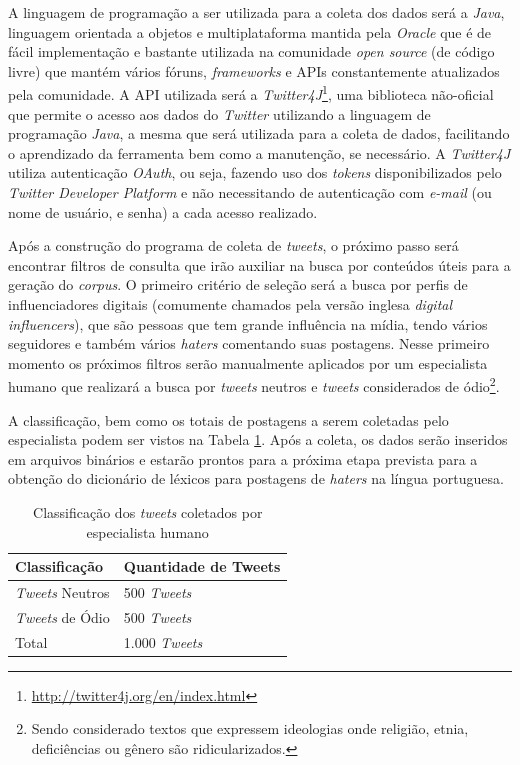 A linguagem de programação a ser utilizada para a coleta dos dados será a \textit{Java}, linguagem orientada a objetos e multiplataforma mantida pela \textit{Oracle} que é de fácil implementação e bastante utilizada na comunidade \textit{open source} (de código livre) que mantém vários fóruns, \textit{frameworks} e APIs constantemente atualizados pela comunidade. A API utilizada será a \textit{Twitter4J}\footnote{\url{http://twitter4j.org/en/index.html}}, uma biblioteca não-oficial que permite o acesso aos dados do \textit{Twitter} utilizando a linguagem de programação \textit{Java}, a mesma que será utilizada para a coleta de dados, facilitando o aprendizado da ferramenta bem como a manutenção, se necessário. A \textit{Twitter4J} utiliza autenticação \textit{OAuth}, ou seja, fazendo uso dos \textit{tokens} disponibilizados pelo \textit{Twitter Developer Platform} e não necessitando de autenticação com \textit{e-mail} (ou nome de usuário, e senha) a cada acesso realizado. 

Após a construção do programa de coleta de \textit{tweets}, o próximo passo será encontrar filtros de consulta que irão auxiliar na busca por conteúdos úteis para a geração do \textit{corpus}. O primeiro critério de seleção será a busca por perfis de influenciadores digitais (comumente chamados pela versão inglesa \textit{digital influencers}), que são pessoas que tem grande influência na mídia, tendo vários seguidores e também vários \textit{haters} comentando suas postagens. Nesse primeiro momento os próximos filtros serão manualmente aplicados por um especialista humano que realizará a busca por \textit{tweets} neutros e \textit{tweets} considerados de ódio\footnote{Sendo considerado textos que expressem ideologias onde religião, etnia, deficiências ou gênero são ridicularizados.}. 

A classificação, bem como os totais de postagens a serem coletadas pelo especialista podem ser vistos na Tabela \ref{tab:classificacaotweets}.
Após a coleta, os dados serão inseridos em arquivos binários e estarão prontos para a próxima etapa prevista para a obtenção do dicionário de léxicos para postagens de \textit{haters} na língua portuguesa.
\begin{table}[h!]
  \begin{center}
    \caption{Classificação dos \textit{tweets} coletados por especialista humano}
    \label{tab:classificacaotweets}
    \begin{tabular}{ll} %
    \textbf{Classificação} & \textbf{Quantidade de Tweets}\\
    \hline
    \textit{Tweets} Neutros&500 \textit{Tweets}\\
    \textit{Tweets} de Ódio&500 \textit{Tweets}\\
    \hline
    Total&1.000 \textit{Tweets}\\
    \end{tabular}
  \end{center}
\end{table}

